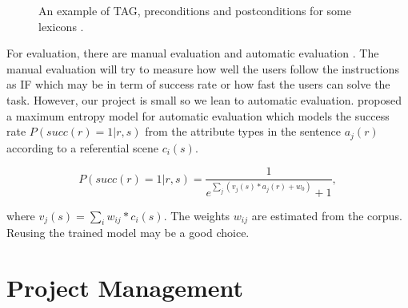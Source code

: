 \documentclass[11pt]{article} %
\begin{document}
\begin{figure}[hbt!]
\centering
{}
\qquad
{}
\caption{An example of TAG, preconditions and postconditions for some lexicons \cite{garoufi2014generation}. \label{overflow}}
\label{fig:exampleTAG}
\end{figure}

For evaluation, there are manual evaluation and automatic evaluation \cite{garoufi2014generation}. The manual evaluation will try to measure how well the users follow the instructions as IF which may be in term of success rate or how fast the users can solve the task. However, our project is small so we lean to automatic evaluation. \cite{garoufi2014generation} proposed a maximum entropy model for automatic evaluation which models the success rate $P(succ(r) = 1|r,s)$ from the attribute types in the sentence $a_j(r)$ according to a referential scene $c_i(s)$. 

\begin{equation} \label{auto_eqn}
P(succ(r) = 1| r, s) =\frac{1}{e^{\sum_j (v_j(s)*a_j(r) + w_0)} + 1} ,
\end{equation}

where $v_j(s) = \sum_i w_{ij} * c_i(s)$. The weights $w_{ij}$ are estimated from the corpus. Reusing the trained model may be a good choice.

\section{Project Management}
\end{document}
